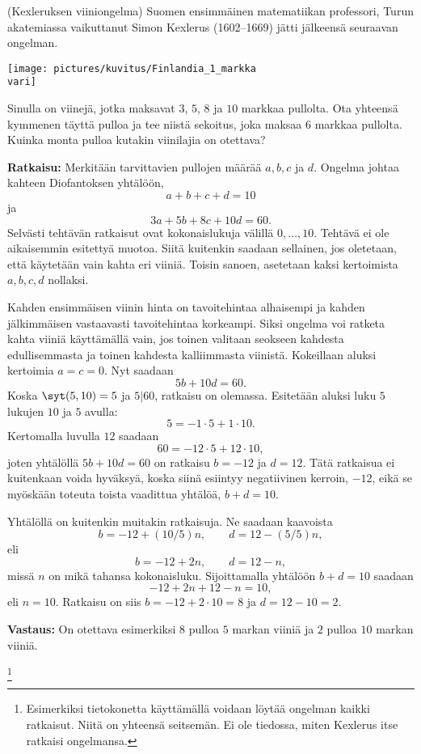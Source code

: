 \begin{esimerkki}
 (Kexleruksen viiniongelma)
Suomen ensimmäinen matematiikan professori, Turun
akatemiassa vaikuttanut Simon Kexlerus (1602--1669) jätti
jälkeensä seuraavan ongelman.

\medskip

\begin{center}
\texttt{[image: pictures/kuvitus/Finlandia\_1\_markka\\vari]}
\end{center}

\medskip

Sinulla on viinejä, jotka maksavat $3$, $5$, $8$ ja $10$
markkaa pullolta. Ota yhteensä kymmenen täyttä pulloa ja
tee niistä sekoitus, joka maksaa $6$ markkaa pullolta.
Kuinka monta pulloa kutakin viinilajia on otettava?

{\bf Ratkaisu:} Merkitään tarvittavien pullojen määrää
$a, b, c$ ja $d$. Ongelma johtaa kahteen Diofantoksen
yhtälöön,
\[
a+b+c+d = 10
\]
ja
\[
3a+5b+8c+10d = 60.
\]
Selvästi tehtävän ratkaisut ovat kokonaislukuja välillä
$0, \ldots, 10$. Tehtävä ei ole aikaisemmin esitettyä
muotoa. Siitä kuitenkin saadaan sellainen, jos oletetaan,
että käytetään vain kahta eri viiniä. Toisin sanoen,
asetetaan kaksi kertoimista $a, b, c, d$ nollaksi.

Kahden ensimmäisen viinin hinta on tavoitehintaa
alhaisempi ja kahden jälkimmäisen vastaavasti
tavoitehintaa korkeampi. Siksi ongelma voi ratketa kahta
viiniä käyttämällä vain, jos toinen valitaan seokseen
kahdesta edullisemmasta ja toinen kahdesta kalliimmasta
viinistä. Kokeillaan aluksi kertoimia $a=c=0$. Nyt
saadaan
\[
5b + 10d = 60.
\]
Koska $\syt(5, 10)=5$ ja $5|60$, ratkaisu on olemassa.
Esitetään aluksi luku $5$ lukujen $10$ ja $5$ avulla:
\[
5 = -1 \cdot 5 + 1\cdot 10.
\]
Kertomalla luvulla $12$ saadaan
\[
60 = -12\cdot 5 + 12\cdot 10,
\]
joten yhtälöllä $5b+10d=60$ on ratkaisu $b=-12$ ja $d=12$. Tätä ratkaisua ei kuitenkaan voida hyväksyä, koska siinä esiintyy negatiivinen kerroin, $-12$, eikä se myöskään toteuta toista vaadittua yhtälöä, $b+d=10$.

Yhtälöllä on kuitenkin muitakin ratkaisuja. Ne saadaan
kaavoista
\[
b= -12 + (10/5)n, \qquad d=12 - (5/5)n,
\]
eli
\[
b= -12 + 2n, \qquad d=12 - n,
\]
missä $n$ on mikä tahansa kokonaisluku. Sijoittamalla
yhtälöön $b+d=10$ saadaan
\[
-12 + 2n + 12 - n = 10,
\]
eli $n=10$. Ratkaisu on siis $b=-12+2 \cdot 10=8$ ja
$d=12-10=2$.

{\bf Vastaus:} On otettava esimerkiksi $8$ pulloa $5$
markan viiniä ja $2$ pulloa $10$ markan viiniä.

\footnote{Esimerkiksi tietokonetta käyttämällä voidaan löytää
ongelman kaikki ratkaisut. Niitä on yhteensä seitsemän.
Ei ole tiedossa, miten Kexlerus itse ratkaisi ongelmansa.}
\end{esimerkki}

